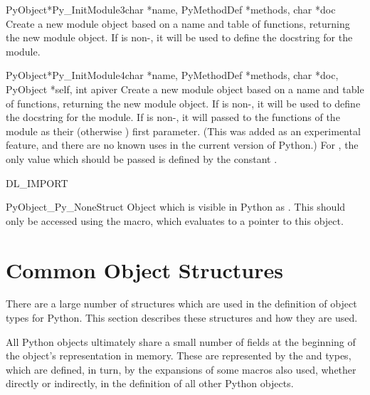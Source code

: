 \begin{cfuncdesc}{PyObject*}{Py_InitModule3}{char *name,
                                             PyMethodDef *methods,
                                             char *doc}
  Create a new module object based on a name and table of functions,
  returning the new module object.  If  is non-\NULL, it will
  be used to define the docstring for the module.
\end{cfuncdesc}

\begin{cfuncdesc}{PyObject*}{Py_InitModule4}{char *name,
                                             PyMethodDef *methods,
                                             char *doc, PyObject *self,
                                             int apiver}
  Create a new module object based on a name and table of functions,
  returning the new module object.  If  is non-\NULL, it will
  be used to define the docstring for the module.  If  is
  non-\NULL, it will passed to the functions of the module as their
  (otherwise \NULL) first parameter.  (This was added as an
  experimental feature, and there are no known uses in the current
  version of Python.)  For , the only value which should
  be passed is defined by the constant .

\end{cfuncdesc}

DL_IMPORT

\begin{cvardesc}{PyObject}{_Py_NoneStruct}
  Object which is visible in Python as .  This should only
  be accessed using the  macro, which evaluates to a
  pointer to this object.
\end{cvardesc}


\section{Common Object Structures \label{common-structs}}

There are a large number of structures which are used in the
definition of object types for Python.  This section describes these
structures and how they are used.

All Python objects ultimately share a small number of fields at the
beginning of the object's representation in memory.  These are
represented by the  and  types,
which are defined, in turn, by the expansions of some macros also
used, whether directly or indirectly, in the definition of all other
Python objects.

